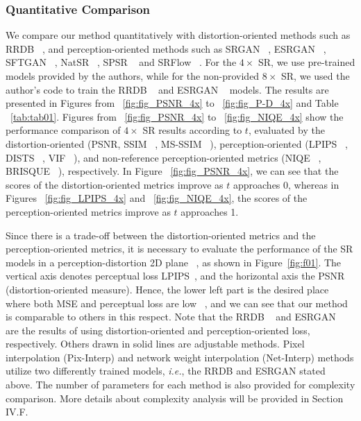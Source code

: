 \documentclass{article}
\begin{document}
\subsubsection{Quantitative Comparison}
We compare our method quantitatively with distortion-oriented methods such as RRDB ~\cite{2018esrgan}, and perception-oriented methods such as SRGAN ~\cite{2017photo}, ESRGAN ~\cite{2018esrgan}, SFTGAN ~\cite{2018recovering}, NatSR ~\cite{2019natural}, SPSR ~\cite{2020structure} and SRFlow ~\cite{2020srflow}. For the $4\times$ SR, we use pre-trained models provided by the authors, while for the non-provided $8\times$ SR, we used the author's code to train the RRDB ~\cite{2018esrgan} and ESRGAN ~\cite{2018esrgan} models. The results are presented in Figures from ~\ref{fig:fig_PSNR_4x} to ~\ref{fig:fig_P-D_4x} and Table ~\ref{tab:tab01}.
Figures from ~\ref{fig:fig_PSNR_4x} to ~\ref{fig:fig_NIQE_4x} show the performance comparison of $4\times$ SR results according to $t$, evaluated by the distortion-oriented (PSNR, SSIM ~\cite{wang2004image}, MS-SSIM ~\cite{wang2003multiscale}), perception-oriented (LPIPS ~\cite{zhang2018unreasonable}, DISTS ~\cite{ding2020image}, VIF ~\cite{sheikh2006image}), and non-reference perception-oriented metrics (NIQE ~\cite{mittal2012making}, BRISQUE ~\cite{mittal2012no}), respectively. In Figure ~\ref{fig:fig_PSNR_4x}, we can see that the scores of the distortion-oriented metrics improve as $t$ approaches 0, whereas in Figures ~\ref{fig:fig_LPIPS_4x} and ~\ref{fig:fig_NIQE_4x}, the scores of the perception-oriented metrics improve as $t$ approaches 1.


Since there is a trade-off between the distortion-oriented metrics and the perception-oriented metrics, it is necessary to evaluate the performance of the SR models in a perception-distortion 2D plane ~\cite{blau2018perception}, as shown in Figure~\ref{fig:f01}. The vertical axis denotes perceptual loss LPIPS~\cite{zhang2018unreasonable}, and the horizontal axis the PSNR (distortion-oriented measure). Hence, the lower left part is the desired place where both MSE and perceptual loss are low ~\cite{blau2018perception}, and we can see that our method is comparable to others in this respect. Note that the RRDB ~\cite{2018esrgan} and ESRGAN ~\cite{2018esrgan} are the results of using distortion-oriented and perception-oriented loss, respectively. Others drawn in solid lines are adjustable methods. Pixel interpolation (Pix-Interp) and network weight interpolation (Net-Interp) methods utilize two differently trained models, {\em i.e.}, the RRDB and ESRGAN stated above. The number of parameters for each method is also provided for complexity comparison. More details about complexity analysis will be provided in Section IV.F.
\end{document}
